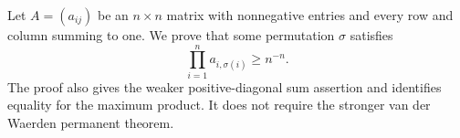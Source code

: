 Let $A=(a_{ij})$ be an $n\times n$ matrix with nonnegative entries and every row and column summing to one. We prove that some permutation $\sigma$ satisfies
\[\prod_{i=1}^n a_{i,\sigma(i)}\ge n^{-n}.\tag{1}\]
The proof also gives the weaker positive-diagonal sum assertion and identifies equality for the maximum product. It does not require the stronger van der Waerden permanent theorem.

